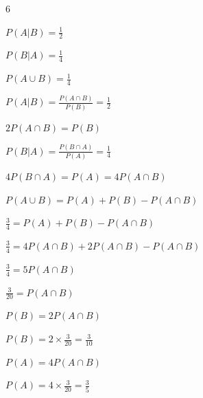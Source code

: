 \documentclass[12 pt]{article}
\begin{document}
    \begin{exercise}{6}
    \hfill

    $P(A|B) = \frac{1}{2}$

    $P(B|A) = \frac{1}{4}$

    $P(A \cup B) = \frac{1}{4}$

    \hfill

    $P(A|B) = \frac{P(A \cap B)}{P(B)} = \frac{1}{2}$
    
    $2 P(A \cap B) = P(B)$

    \hfill

    $P(B|A) = \frac{P(B \cap A)}{P(A)} = \frac{1}{4}$

    $4 P(B \cap A) = P(A) = 4 P(A \cap B)$

    \hfill

    $P(A \cup B) = P(A) + P(B) - P(A \cap B)$
    
    $\frac{3}{4} = P(A) + P(B) - P(A \cap B)$
    
    $\frac{3}{4} = 4 P(A \cap B) + 2 P(A \cap B) - P(A \cap B)$

    $\frac{3}{4} = 5 P(A \cap B)$

    $\frac{3}{20} = P(A \cap B)$

    \hfill

    $P(B) = 2 P(A \cap B)$

    $P(B) = 2 \times \frac{3}{20} = \frac{3}{10}$

    \hfill

    $P(A) = 4 P(A \cap B)$

    $P(A) = 4 \times \frac{3}{20} = \frac{3}{5}$      
    \end{exercise}
\end{document}
